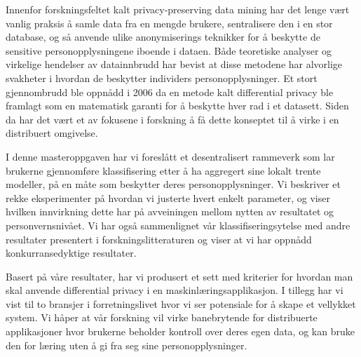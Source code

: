 \noindent 
Innenfor forskningsfeltet kalt privacy-preserving data mining har det lenge v{\ae}rt vanlig praksis {\aa} samle data fra en mengde brukere, sentralisere den i en stor database, og s{\aa} anvende ulike anonymiserings teknikker for {\aa} beskytte de sensitive personopplysningene iboende i dataen. B{\aa}de teoretiske analyser og virkelige hendelser av datainnbrudd har bevist at disse metodene har alvorlige svakheter i hvordan de beskytter individers personopplysninger. Et stort gjennombrudd ble oppn{\aa}dd i 2006 da en metode kalt differential privacy ble framlagt som en matematisk garanti for {\aa} beskytte hver rad i et datasett. Siden da har det v{\ae}rt et av fokusene i forskning {\aa} f{\aa} dette konseptet til {\aa} virke i en distribuert omgivelse.

I denne masteroppgaven har vi foresl{\aa}tt et desentralisert rammeverk som lar brukerne gjennomf{\o}re klassifisering etter {\aa} ha aggregert sine lokalt trente modeller, p{\aa} en m{\aa}te som beskytter deres personopplysninger. Vi beskriver et rekke eksperimenter p{\aa} hvordan vi justerte hvert enkelt parameter, og viser hvilken innvirkning dette har p{\aa} avveiningen mellom nytten av resultatet og personvernsniv{\aa}et. Vi har ogs{\aa} sammenlignet v{\aa}r klassifiseringsytelse med andre resultater presentert i forskningslitteraturen og viser at vi har oppn{\aa}dd konkurransedyktige resultater.     

Basert p{\aa} v{\aa}re resultater, har vi produsert et sett med kriterier for hvordan man skal anvende differential privacy i en maskinl{\ae}ringsapplikasjon. I tillegg har vi vist til to bransjer i forretningslivet hvor vi ser potensiale for {\aa} skape et 
vellykket system. Vi h{\aa}per at v{\aa}r forskning vil virke banebrytende for distribuerte applikasjoner hvor brukerne beholder kontroll over deres egen data, og kan bruke den for l{\ae}ring uten {\aa} gi fra seg sine personopplysninger.   

\cleardoublepage
